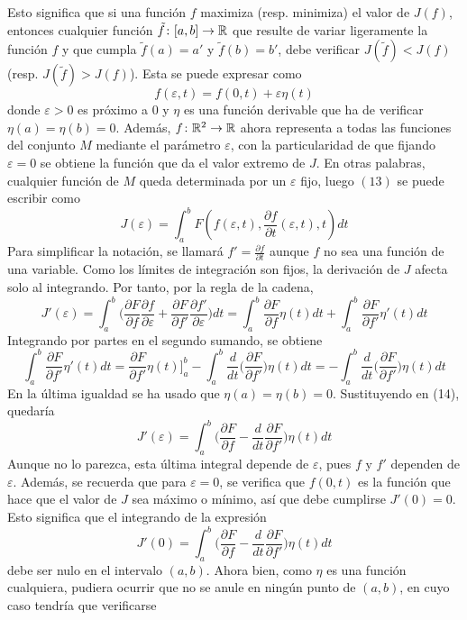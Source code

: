 \documentclass[12pt]{report}
\begin{document}
Esto significa que si una función $f$ maximiza (resp. minimiza) el valor de $J(f)$, entonces cualquier función $\tilde{f} \colon [a,b] \to \mathbb R$ que resulte de variar ligeramente la función $f$ y que cumpla $\tilde{f}(a)=a'$ y $\tilde{f}(b)=b'$, debe verificar $J(\tilde{f}) < J(f)$ (resp. $J(\tilde{f}) > J(f)$). Esta  se puede expresar como
\[f(\varepsilon,t) = f(0,t)+\varepsilon \eta (t)\]
donde $\varepsilon > 0$ es próximo a 0 y $\eta$ es una función derivable que ha de verificar $\eta(a) =\eta(b)= 0$. Además, $f \colon \mathbb R^2 \to \mathbb R$ ahora representa a todas las funciones del conjunto $M$ mediante el parámetro $\varepsilon$, con la particularidad de que fijando $\varepsilon = 0$ se obtiene la función que da el valor extremo de $J$. En otras palabras, cualquier función de $M$ queda determinada por un $\varepsilon$ fijo, luego $(13)$ se puede escribir como
\[J(\varepsilon) = \int_a^b F(f(\varepsilon,t),\frac{\partial f}{\partial t}(\varepsilon,t),t)dt\]
Para simplificar la notación, se llamará $f' = \frac{\partial f}{\partial t}$ aunque $f$ no sea una función de una variable. Como los límites de integración son fijos, la derivación de $J$ afecta solo al integrando. Por tanto, por la regla de la cadena,
\[J'(\varepsilon) = \int_a^b \biggl(\frac{\partial F}{\partial f} \frac{\partial f}{\partial \varepsilon} + \frac{\partial F}{\partial f'} \frac{\partial f'}{\partial \varepsilon} \biggr)dt = \int_a^b \frac{\partial F}{\partial f} \eta(t) dt + \int_a^b \frac{\partial F}{\partial f'} \eta'(t) dt \tag{14}\]
Integrando por partes en el segundo sumando, se obtiene
\[\int_a^b \frac{\partial F}{\partial f'} \eta'(t) dt = \frac{\partial F}{\partial f'}\eta(t) \biggr]_a^b - \int_a^b \frac{d}{dt} \biggl(\frac{\partial F}{\partial f'} \biggr)\eta(t)dt = - \int_a^b \frac{d}{dt} \biggl(\frac{\partial F}{\partial f'} \biggr)\eta(t)dt\]
En la última igualdad se ha usado que $\eta(a)=\eta(b) = 0$. Sustituyendo en (14), quedaría 
\[J'(\varepsilon) = \int_a^b \biggl( \frac{\partial F}{\partial f}-\frac{d}{dt} \frac{\partial F}{\partial f'} \biggr)\eta(t)dt \tag{15}\]
Aunque no lo parezca, esta última integral depende de $\varepsilon$, pues $f$ y $f'$ dependen de $\varepsilon$. Además, se recuerda que para $\varepsilon = 0$, se verifica que $f(0,t)$ es la función que hace que el valor de $J$ sea máximo o mínimo, así que debe cumplirse $J'(0) = 0$. Esto significa que el integrando de la expresión
\[J'(0) = \int_a^b \biggl( \frac{\partial F}{\partial f}-\frac{d}{dt} \frac{\partial F}{\partial f'} \biggr)\eta(t)dt\]
debe ser nulo en el intervalo $(a,b)$. Ahora bien, como $\eta$ es una función cualquiera, pudiera ocurrir que no se anule en ningún punto de $(a,b)$, en cuyo caso tendría que verificarse
\end{document}
